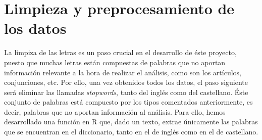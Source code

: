 \section{Limpieza y preprocesamiento de los datos}
La limpiza de las letras es un paso crucial en el desarrollo de éste proyecto, puesto que muchas letras están compuestas de palabras que no aportan información relevante a la hora de realizar el análisis, como son los artículos, conjunciones, etc. Por ello, una vez obtenidos todos los datos, el paso siguiente será eliminar las llamadas \textit{stopwords}, tanto del inglés como del castellano. Éste conjunto de palabras está compuesto por los tipos comentados anteriormente, es decir, palabras que no aportan información al análisis. Para ello, hemos desarrollado una función en R que, dado un texto, extrae únicamente las palabras que se encuentran en el diccionario, tanto en el de inglés como en el de castellano.

